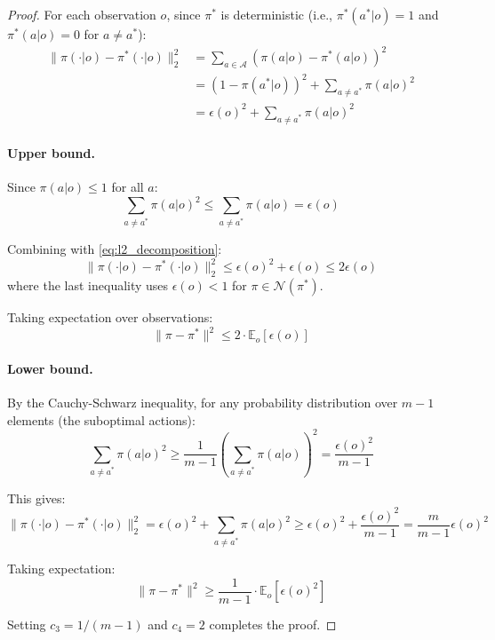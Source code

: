 \begin{proof}
For each observation $o$, since $\pi^*$ is deterministic (i.e., $\pi^*(a^*|o) = 1$ and $\pi^*(a|o) = 0$ for $a \neq a^*$):
\begin{align}
    \|\pi(\cdot|o) - \pi^*(\cdot|o)\|_2^2 &= \sum_{a \in \mathcal{A}} (\pi(a|o) - \pi^*(a|o))^2 \\
    &= (1 - \pi(a^*|o))^2 + \sum_{a \neq a^*} \pi(a|o)^2 \\
    &= \epsilon(o)^2 + \sum_{a \neq a^*} \pi(a|o)^2
    \label{eq:l2_decomposition}
\end{align}

\paragraph{Upper bound.} Since $\pi(a|o) \le 1$ for all $a$:
\begin{equation}
    \sum_{a \neq a^*} \pi(a|o)^2 \le \sum_{a \neq a^*} \pi(a|o) = \epsilon(o)
\end{equation}

Combining with \eqref{eq:l2_decomposition}:
\begin{equation}
    \|\pi(\cdot|o) - \pi^*(\cdot|o)\|_2^2 \le \epsilon(o)^2 + \epsilon(o) \le 2\epsilon(o)
\end{equation}
where the last inequality uses $\epsilon(o) < 1$ for $\pi \in \mathcal{N}(\pi^*)$.

Taking expectation over observations:
\begin{equation}
    \|\pi - \pi^*\|^2 \le 2 \cdot \mathbb{E}_o[\epsilon(o)]
\end{equation}

\paragraph{Lower bound.} By the Cauchy-Schwarz inequality, for any probability distribution over $m-1$ elements (the suboptimal actions):
\begin{equation}
    \sum_{a \neq a^*} \pi(a|o)^2 \ge \frac{1}{m-1} \left(\sum_{a \neq a^*} \pi(a|o)\right)^2 = \frac{\epsilon(o)^2}{m-1}
\end{equation}

This gives:
\begin{equation}
    \|\pi(\cdot|o) - \pi^*(\cdot|o)\|_2^2 = \epsilon(o)^2 + \sum_{a \neq a^*} \pi(a|o)^2 \ge \epsilon(o)^2 + \frac{\epsilon(o)^2}{m-1} = \frac{m}{m-1} \epsilon(o)^2
\end{equation}

Taking expectation:
\begin{equation}
    \|\pi - \pi^*\|^2 \ge \frac{1}{m-1} \cdot \mathbb{E}_o[\epsilon(o)^2]
\end{equation}

Setting $c_3 = 1/(m-1)$ and $c_4 = 2$ completes the proof.
\end{proof}

